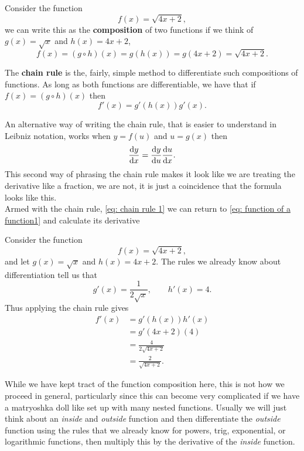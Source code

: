 Consider the function
\begin{equation}
f(x)=\sqrt{4x+2},
\label{eq: function of a function1}
\end{equation}
we can write this as the \textbf{composition} of two functions if we think of $g(x)=\sqrt{x}$ and $h(x)=4x+2$,
\begin{equation*}
f(x)=\left(g\circ h\right)(x)=g(h(x))=g\left(4x+2\right)=\sqrt{4x+2}.
\end{equation*} 

The \textbf{chain rule} is the, fairly, simple method to differentiate such compositions of functions.  As long as both functions are differentiable, we have that if $f(x)=(g\circ h)(x)$ then
\begin{equation}
f'(x)=g'(h(x))g'(x). \label{eq: chain rule 1}
\end{equation}

An alternative way of writing the chain rule, that is easier to understand in Leibniz notation, works when $y=f(u)$ and $u=g(x)$ then
\begin{equation}
\frac{\mathrm{d} y}{\mathrm{d} x}=\frac{\mathrm{d} y}{\mathrm{d} u}\frac{\mathrm{d} u}{\mathrm{d} x}. \label{eq: chain rule 2}
\end{equation}
This second way of phrasing the chain rule makes it look like we are treating the derivative like a fraction, we are not, it is just a coincidence that the formula looks like this.\\


Armed with the chain rule, \cref{eq: chain rule 1} we can return to \cref{eq: function of a function1}  and calculate its derivative
\begin{ex}
Consider the function
\begin{equation*}
f(x)=\sqrt{4x+2},
\end{equation*}
and let $g(x)=\sqrt{x}$ and $h(x)=4x+2$. The rules we already know about differentiation tell us that
\begin{equation*}
g'(x)=\frac{1}{2\sqrt{x}}, \qquad h'(x)=4.
\end{equation*}
Thus applying the chain rule gives
\begin{align*}
f'(x)	&=g'(h(x))h'(x)\\
	&=g'(4x+2)(4)\\
	&=\frac{4}{2\sqrt{4x+2}}\\
	&=\frac{2}{\sqrt{4x+2}}.
\end{align*}
\end{ex}

While we have kept tract of the function composition here, this is not how we proceed in general, particularly since this can become very complicated if we have a matryoshka doll like set up with many nested functions. Usually we will just think about an \textit{inside} and \textit{outside} function and then differentiate the \textit{outside} function using the rules that we already know for powers, trig, exponential, or logarithmic functions, then multiply this by the derivative of the \textit{inside} function. \\

